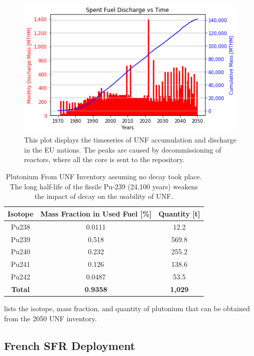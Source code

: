 \begin{figure}[htbp!]
	\begin{center}
			\includegraphics[scale=0.7]{./images/eu_future/snf_discharge.png}
	\end{center}
	\caption{This plot displays the timeseries of \gls{UNF} accumulation and discharge in the \gls{EU} nations.
			 The peaks are caused by decommissioning of reactors, where all the core is sent to the repository.}
	\label{fig:eu_snf}
\end{figure}
\FloatBarrier


\begin{table}[h]
	\centering
	\begin{tabular}{ccc}
		\hline
		\textbf{Isotope} & \textbf{Mass Fraction in Used Fuel [\%]} & \textbf{Quantity [t]} \\ \hline
		Pu238 & 0.0111 & 12.2 \\ 
		Pu239 & 0.518 & 569.8 \\ 
		Pu240 & 0.232 & 255.2 \\ 
		Pu241 & 0.126 & 138.6 \\ 
		Pu242 & 0.0487 & 53.5 \\ \hline
		\textbf{Total} & \textbf{0.9358} & \textbf{1,029} \\ \hline
	\end{tabular}
	\caption{Plutonium From \gls{UNF} Inventory assuming no decay
			 took place. The long half-life of the fissile Pu-239 (24,100 years)
			 weakens the impact of decay on the usability of \gls{UNF}.}
	\label{tab:pu}
\end{table}


 lists the isotope, mass fraction,
and quantity of plutonium that can be obtained from the 2050 \gls{UNF} inventory.


\subsection{French \gls{SFR} Deployment}

